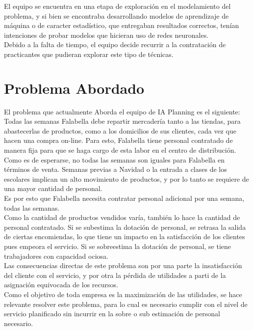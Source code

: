 \documentclass[12pt]{article}
\begin{document}
El equipo se encuentra en una etapa de exploración en el modelamiento del problema, y si bien se encontraba desarrollando  modelos de aprendizaje de máquina o de caracter estadístico, que entregaban resultados correctos, tenían intenciones de probar modelos que hicieran uso de redes neuronales.\\ 
Debido a la falta de tiempo, el equipo decide recurrir a la contratación de practicantes que pudieran explorar este tipo de técnicas.
\section{Problema Abordado}
El problema que actualmente Aborda el equipo de IA Planning es el siguiente: Todas las semanas Falabella debe repartir mercadería tanto a las tiendas, para abastecerlas de productos, como a los domicilios de sus clientes, cada vez que hacen una compra on-line. Para esto, Falabella tiene personal contratado de manera fija para que se haga cargo de esta labor en el centro de distribución. Como es de esperarse, no todas las semanas son iguales para Falabella en términos de venta. Semanas previas a Navidad o la entrada a clases de los escolares implican un alto movimiento de productos, y por lo tanto se requiere de una mayor cantidad de personal. \\ Es por esto que Falabella necesita contratar personal adicional por una semana, todas las semanas. \\ 

Como la cantidad de productos vendidos varía, también lo hace la cantidad de personal contratado. Si se subestima la dotación de personal, se retrasa la salida de ciertas encomiendas, lo que tiene un impacto en la satisfacción de los clientes pues empeora el servicio. Si se sobreestima la dotación de personal, se tiene trabajadores con capacidad ociosa. \\
Las consecuencias directas de este problema son por una parte la insatisfacción del cliente con el servicio, y por otra la pérdida de utilidades a parti de la asignación equivocada de los recursos. \\

Como el objetivo de toda empresa es la maximización de las utilidades, se hace relevante resolver este problema, para lo cual es necesario cumplir con el nivel de servicio planificado sin incurrir en la sobre o sub estimación de personal necesario.
\end{document}

